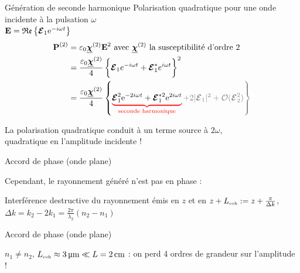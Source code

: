 \documentclass{beamer}
\begin{document}
\begin{frame}{Génération de seconde harmonique}
Polarisation quadratique pour une onde incidente à la pulsation $\omega$ \\
$\boldsymbol{\mathbf{E}} = \mathfrak{Re} \left\{ \boldsymbol{\mathbf{\mathcal{E}}}_1 \text{e}^{-i\omega t} \right\}$
\begin{align*}
\v P^{(2)} &= \varepsilon_0 \tens\chi^{(2)} \v E^2 \text{ avec $\tens\chi^{(2)}$ la susceptibilité d'ordre 2}\\
&= \frac{\varepsilon_0 \tens\chi^{(2)}}{4} \left\{\v\E_1 e^{-i\omega t} + \v\E_1^* e^{i\omega t} \vphantom{\frac12}\right\}^2 \\
&= \frac{\varepsilon_0 \tens\chi^{(2)}}{4} \left\{\ubrace{red}{\v\E_1^2 \e{-2i\omega t} + \v\E_1^{*2} \e{2i\omega t}}{seconde harmonique}
\color{gray} + 2|\v \E_1|^2 + \mathcal O(\v\E_2^2) \vphantom{\frac12} \right\} 
\end{align*}
\begin{beamerboxesrounded}[width=\textwidth]{}
La polarisation quadratique conduit à un terme source à $2\omega$,\\quadratique en l'amplitude incidente !
\end{beamerboxesrounded}
\end{frame}

\begin{frame}{Accord de phase (onde plane)}
\centering
\begin{beamerboxesrounded}[width=\textwidth]{}
Cependant, le rayonnement généré n'est pas en phase :
\end{beamerboxesrounded}
%
\vspace*{-1cm}
Interférence destructive du rayonnement émis en $z$ et en  $z+L_{\mathrm{\scriptscriptstyle {coh}}} := z + \frac{\pi}{\Delta k}$, $\Delta k = k_2 - 2 k_1 = \frac{2\pi}{\lambda_2} \left(n_2 - n_1\right)$
\end{frame}

\begin{frame}{Accord de phase (onde plane)}
\centering

\begin{beamerboxesrounded}[width=0.8\textwidth]{}
$n_1\neq n_2$, $L_{\mathrm{\scriptscriptstyle {coh}}} \approx \SI{3}{\micro\meter} \ll L = \SI{2}{cm}$ : on perd 4 ordres de grandeur sur l'amplitude !
\end{beamerboxesrounded}
\end{frame}
\end{document}
